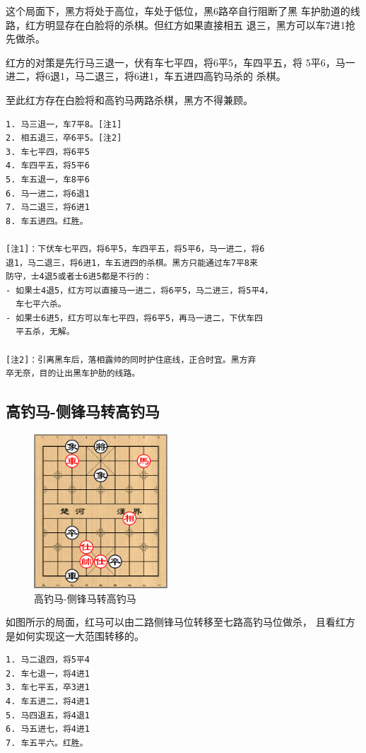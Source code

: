 \documentclass[a5paper,twoside]{book}
\begin{document}
这个局面下，黑方将处于高位，车处于低位，黑6路卒自行阻断了黑
车护肋道的线路，红方明显存在白脸将的杀棋。但红方如果直接相五
退三，黑方可以车7进1抢先做杀。

红方的对策是先行马三退一，伏有车七平四，将6平5，车四平五，将
5平6，马一进二，将6退1，马二退三，将6进1，车五进四高钓马杀的
杀棋。

至此红方存在白脸将和高钓马两路杀棋，黑方不得兼顾。


\begin{verbatim}
1. 马三退一，车7平8。[注1]
2. 相五退三，卒6平5。[注2]
3. 车七平四，将6平5
4. 车四平五，将5平6
5. 车五退一，车8平6
6. 马一进二，将6退1
7. 马二退三，将6进1
8. 车五进四。红胜。

[注1]：下伏车七平四，将6平5，车四平五，将5平6，马一进二，将6
退1，马二退三，将6进1，车五进四的杀棋。黑方只能通过车7平8来
防守，士4退5或者士6进5都是不行的：
- 如果士4退5，红方可以直接马一进二，将6平5，马二进三，将5平4，
  车七平六杀。
- 如果士6进5，红方可以车七平四，将6平5，再马一进二，下伏车四
  平五杀，无解。
  
[注2]：引离黑车后，落相露帅的同时护住底线，正合时宜。黑方弃
卒无奈，目的让出黑车护肋的线路。
\end{verbatim}

\subsection{高钓马-侧锋马转高钓马}
\label{sec-4-5-5}
\begin{figure}[H]
\centering
\includegraphics[width=5cm]{pic/高钓马-侧锋马转高钓马.png}
\caption{高钓马-侧锋马转高钓马}
\end{figure}

如图所示的局面，红马可以由二路侧锋马位转移至七路高钓马位做杀，
且看红方是如何实现这一大范围转移的。

\begin{verbatim}
1. 马二退四，将5平4
2. 车七退一，将4进1
3. 车七平五，卒3进1
4. 车五进二，将4进1
5. 马四退五，将4退1
6. 马五进七，将4进1
7. 车五平六。红胜。
\end{verbatim}
\end{document}
